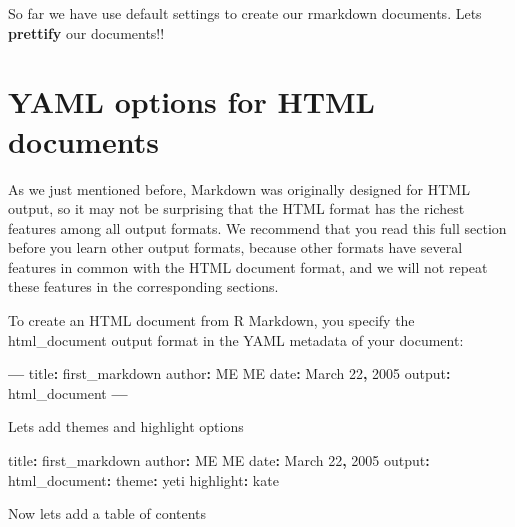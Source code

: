 \documentclass[
]{book}
\newenvironment{Shaded}{\begin{snugshade}}{\end{snugshade}}
\newcommand{\DecValTok}[1]{\textcolor[rgb]{0.00,0.00,0.81}{#1}}
\newcommand{\NormalTok}[1]{#1}
\newcommand{\OperatorTok}[1]{\textcolor[rgb]{0.81,0.36,0.00}{\textbf{#1}}}
\begin{document}
So far we have use default settings to create our rmarkdown documents. Lets \textbf{prettify} our documents!!

\hypertarget{yaml-options-for-html-documents}{%
\section{YAML options for HTML documents}\label{yaml-options-for-html-documents}}

As we just mentioned before, Markdown was originally designed for HTML output, so it may not be surprising that the HTML format has the richest features among all output formats. We recommend that you read this full section before you learn other output formats, because other formats have several features in common with the HTML document format, and we will not repeat these features in the corresponding sections.

To create an HTML document from R Markdown, you specify the html\_document output format in the YAML metadata of your document:

\begin{Shaded}
\begin{Highlighting}[]
\OperatorTok{---}
\NormalTok{title}\OperatorTok{:}\NormalTok{ first_markdown}
\NormalTok{author}\OperatorTok{:}\NormalTok{ ME ME}
\NormalTok{date}\OperatorTok{:}\NormalTok{ March }\DecValTok{22}\OperatorTok{,} \DecValTok{2005}
\NormalTok{output}\OperatorTok{:}\NormalTok{ html_document}
\OperatorTok{---}
\end{Highlighting}
\end{Shaded}

Lets add themes and highlight options

\begin{Shaded}
\begin{Highlighting}[]
\NormalTok{title}\OperatorTok{:}\NormalTok{ first_markdown}
\NormalTok{author}\OperatorTok{:}\NormalTok{ ME ME}
\NormalTok{date}\OperatorTok{:}\NormalTok{ March }\DecValTok{22}\OperatorTok{,} \DecValTok{2005}
\NormalTok{output}\OperatorTok{:} 
\NormalTok{  html_document}\OperatorTok{:}
\NormalTok{    theme}\OperatorTok{:}\NormalTok{ yeti}
\NormalTok{    highlight}\OperatorTok{:}\NormalTok{ kate}
\end{Highlighting}
\end{Shaded}

Now lets add a table of contents
\end{document}
